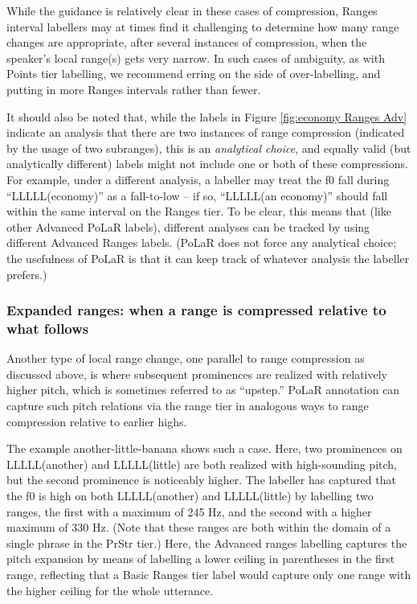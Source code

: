 \documentclass[11pt, twoside]{memoir}
\begin{document}
While the guidance is relatively clear in these cases of compression, Ranges interval labellers may at times find it challenging to determine how many range changes are appropriate, after several instances of compression, when the speaker’s local range(s) gets very narrow. In such cases of ambiguity, as with Points tier labelling, we recommend erring on the side of over-labelling, and putting in more Ranges intervals rather than fewer.

It should also be noted that, while the labels in Figure \ref{fig:economy Ranges Adv} indicate an analysis that there are two instances of range compression (indicated by the usage of two subranges), this is an \emph{analytical choice}, and equally valid (but analytically different) labels might not include one or both of these compressions. For example, under a different analysis, a labeller may treat the f0 fall during “LLLLL(economy)” as a fall-to-low – if so, “LLLLL(an economy)” should fall within the same interval on the Ranges tier. To be clear, this means that (like other Advanced PoLaR labels), different analyses can be tracked by using different Advanced Ranges labels. (PoLaR does not force any analytical choice; the usefulness of PoLaR is that it can keep track of whatever analysis the labeller prefers.)

\subsubsection{Expanded ranges: when a range is compressed relative to what follows}\label{sec:expanded-ranges-when-a-range-is-compressed-relative-to-what-follows}

Another type of local range change, one parallel to range compression as discussed above, is where subsequent prominences are realized with relatively higher pitch, which is sometimes referred to as “upstep.” PoLaR annotation can capture such pitch relations via the range tier in analogous ways to range compression relative to earlier highs.

The example another-little-banana shows such a case. Here, two prominences on LLLLL(another) and LLLLL(little) are both realized with high-sounding pitch, but the second prominence is noticeably higher. The labeller has captured that the f0 is high on both LLLLL(another) and LLLLL(little) by labelling two ranges, the first with a maximum of 245 Hz, and the second with a higher maximum of 330 Hz. (Note that these ranges are both within the domain of a single phrase in the PrStr tier.) Here, the Advanced ranges labelling captures the pitch expansion by means of labelling a lower ceiling in parentheses in the first range, reflecting that a Basic Ranges tier label would capture only one range with the higher ceiling for the whole utterance.
\end{document}
